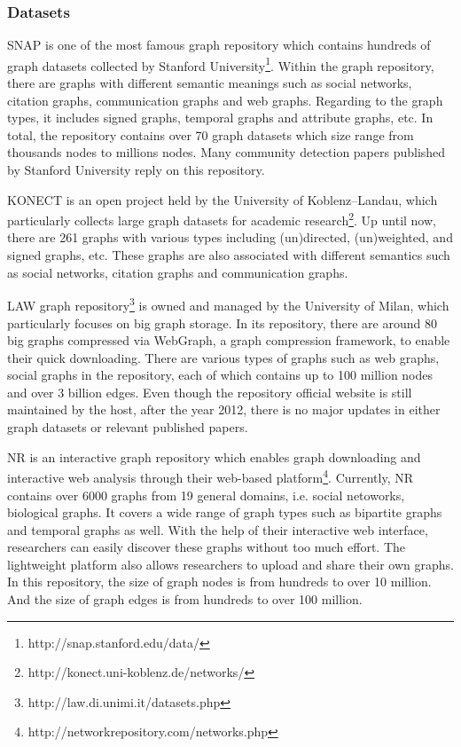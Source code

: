 \subsubsection{Datasets}
SNAP \cite{leskovec2015snap} is one of the most famous graph repository which contains hundreds of graph datasets collected by Stanford University\footnote{http://snap.stanford.edu/data/}. Within the graph repository, there are graphs with different semantic meanings such as social networks, citation graphs, communication graphs and web graphs. Regarding to the graph types, it includes signed graphs, temporal graphs and attribute graphs, etc. In total, the repository contains over 70 graph datasets which size range from thousands nodes to millions nodes. Many community detection papers published by Stanford University reply on this repository.

KONECT \cite{kunegis2013konect}  is an open project held by the University of Koblenz–Landau, which particularly collects large graph datasets for academic research\footnote{http://konect.uni-koblenz.de/networks/}. Up until now, there are 261 graphs with various types including (un)directed, (un)weighted, and signed graphs, etc. These graphs are also associated with different semantics such as social networks, citation graphs and communication graphs. 

LAW graph repository\footnote{http://law.di.unimi.it/datasets.php} is owned and managed by the University of Milan, which particularly focuses on big graph storage. In its repository, there are around 80 big graphs compressed via WebGraph, a graph compression framework, to  enable their quick downloading. There are various types of graphs such as web graphs, social graphs in the repository, each of which contains up to 100 million nodes and over 3 billion edges.  Even though the repository official website is still maintained by the host, after the year 2012, there is no major updates in either graph datasets or relevant published papers.

NR \cite{rossi2015network} is an interactive graph repository which enables graph downloading and interactive web analysis through their web-based platform\footnote{http://networkrepository.com/networks.php}. Currently, NR contains over 6000 graphs from 19 general domains, i.e. social netoworks, biological graphs. It covers a wide range of graph types such as bipartite graphs and temporal graphs as well. With the help of their interactive web interface, researchers can easily discover these graphs without too much effort. The lightweight platform also allows researchers to upload and share their own graphs. In this repository, the size of graph nodes is from hundreds to over 10 million. And the size of graph edges is from hundreds to over 100 million. 


